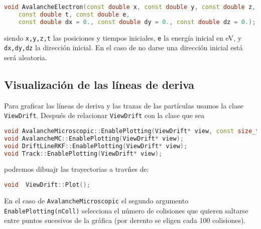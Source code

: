 \begin{lstlisting}[language=C++,style=c++]
void AvalancheElectron(const double x, const double y, const double z,
    const double t, const double e, 
    const double dx = 0., const double dy = 0., const double dz = 0.);
\end{lstlisting}
\vspace*{0.6em}

siendo \texttt{x,y,z,t} las posiciones y tiempos iniciales, \texttt{e} la energía inicial en eV, y \texttt{dx,dy,dz} la dirección inicial. En el caso de no darse una dirección inicial está será aleatoria. 


\subsection{Visualización de las líneas de deriva}

Para graficar las líneas de deriva y las trazas de las partículas usamos la clase \texttt{ViewDrift}. Después de relacionar \texttt{ViewDrift} con la clase que sea 

\begin{lstlisting}[language=C++,style=c++]
void AvalancheMicroscopic::EnablePlotting(ViewDrift* view, const size_t nColl = 100);
void AvalancheMC::EnablePlotting(ViewDrift* view);
void DriftLineRKF::EnablePlotting(ViewDrift* view);
void Track::EnablePlotting(ViewDrift* view);
\end{lstlisting}
\vspace*{0.6em}
podremos dibuajr las trayectorias a travñes de: 

\begin{lstlisting}[language=C++,style=c++]
void  ViewDrift::Plot();
\end{lstlisting}
En el caso de \texttt{AvalancheMicroscopic} el segundo argumento \texttt{EnablePlotting(nColl)} selecciona el número de colisiones que quieren saltarse entre puntos sucesivos de la gráfica (por derento se eligen cada 100 colisiones). 